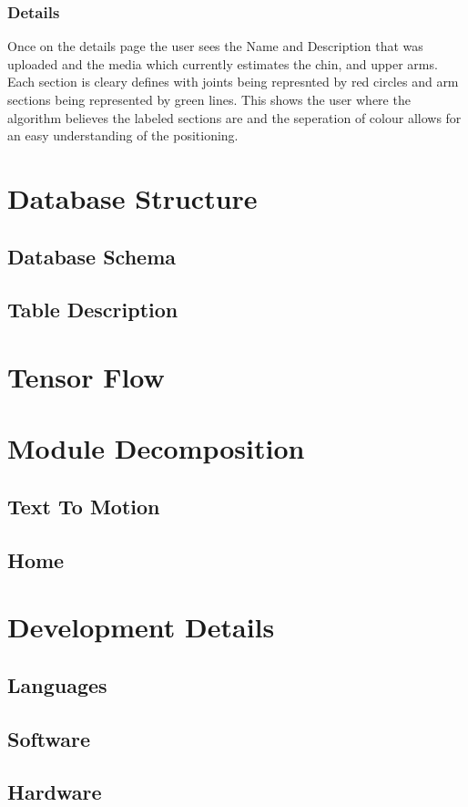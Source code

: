 \documentclass{scrreprt}
\begin{document}
\subsection{Details}
Once on the details page the user sees the Name and Description that was uploaded and the media which currently estimates the chin, and upper arms. Each section is cleary defines with joints being represnted by red circles and arm sections being represented by green lines. This shows the user where the algorithm believes the labeled sections are and the seperation of colour allows for an easy understanding of the positioning. 

\chapter{Database Structure}

\section{Database Schema}
\section{Table Description}


\chapter{Tensor Flow}


\chapter{Module Decomposition}

\section{Text To Motion}
\section{Home}


\chapter{Development Details}

\section{Languages}
\section{Software}
\section{Hardware}
\end{document}
